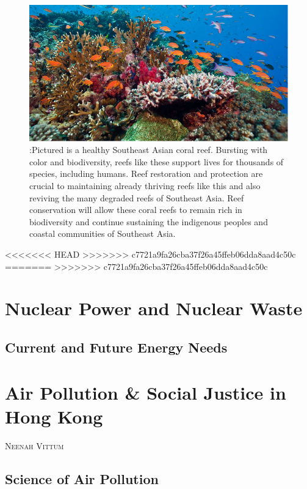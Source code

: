 \documentclass{book}\usepackage{knitr}
\makeatletter
\newcommand{\chapterauthor}[1]{%
  {\parindent0pt\vspace*{-25pt}%
  \linespread{1.1}\large\scshape#1%
  \par\nobreak\vspace*{35pt}}
  \@afterheading%
}
\makeatother
\begin{document}
\begin{knitrout}
\begin{kframe}
\begin{figure}
\includegraphics[width=\linewidth]{images/reefbigchillin}
\caption{:Pictured is a healthy Southeast Asian coral reef. Bursting with color and biodiversity, reefs like these support lives for thousands of species, including humans. Reef restoration and protection are crucial to maintaining already thriving reefs like this and also reviving the many degraded reefs of Southeast Asia. Reef conservation will allow these coral reefs to remain rich in biodiversity and continue sustaining the indigenous peoples and coastal communities of Southeast Asia.}
\label{fig:A Healthy Southeast Asian Coral Reef}
\end{figure}
<<<<<<< HEAD
>>>>>>> c7721a9fa26cba37f26a45ffeb06dda8aad4c50c
=======
>>>>>>> c7721a9fa26cba37f26a45ffeb06dda8aad4c50c


\chapter{Nuclear Power and Nuclear Waste}

\section{Current and Future Energy Needs}



\chapter{Air Pollution \& Social Justice in Hong Kong}

\chapterauthor{Neenah Vittum}

\section{Science of Air Pollution}


\end{kframe}
\end{knitrout}
\end{document}
